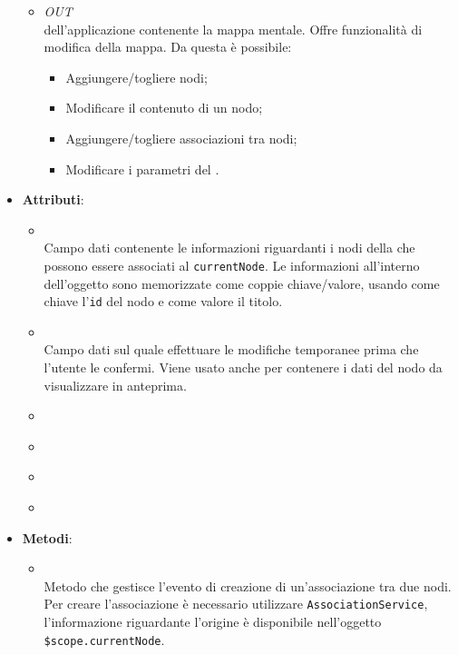 \begin{itemize}
\begin{itemize}
\item \textit{OUT} \hyperref[\nogloxy{Premi::Front-End::Views::MindmapEditorView}]{}\\
 dell’applicazione contenente la mappa mentale. Offre funzionalità di modifica della mappa.
Da questa  è possibile:
\begin{itemize}
\item Aggiungere/togliere nodi;
\item Modificare il contenuto di un nodo;
\item Aggiungere/togliere associazioni tra nodi;
\item Modificare i parametri del .
\end{itemize}
\end{itemize}
\item \textbf{Attributi}:
\begin{itemize}
\item {}
\\ Campo dati contenente le informazioni riguardanti i nodi della  che possono essere associati al \texttt{currentNode}. Le informazioni all'interno dell'oggetto sono memorizzate come coppie chiave/valore, usando come chiave l'\texttt{id} del nodo e come valore il titolo.
\item {}
\\ Campo dati sul quale effettuare le modifiche temporanee prima che l’utente le confermi. Viene usato anche per contenere i dati del nodo da visualizzare in anteprima.
\item {}
\\ \dpNodeServiceField
\item {}
\\ \dpProjectServiceField
\item {}
\\ \dpMDDialogServiceField
\item {}
\\ \dpScopeField
\end{itemize}
\item \textbf{Metodi}:
\begin{itemize}
\item {}
\\ Metodo che gestisce l'evento di creazione di un'associazione tra due nodi. Per creare l'associazione è necessario utilizzare \texttt{AssociationService}, l'informazione riguardante l'origine è disponibile nell'oggetto \texttt{\$scope.currentNode}.

\end{itemize}
\end{itemize}

